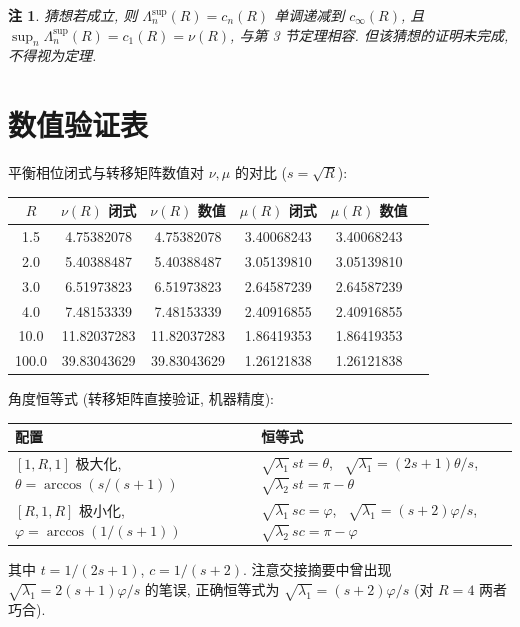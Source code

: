 \documentclass[UTF8]{ctexart}
\newtheorem{remark}[theorem]{注}
\begin{document}
\begin{remark}
猜想若成立, 则 $\Lambda_n^{\sup}(R) = c_n(R)$ 单调递减到 $c_{\infty}(R)$,
且 $\sup_n \Lambda_n^{\sup}(R) = c_1(R) = \nu(R)$, 与第 3 节定理相容.
但该猜想的证明未完成, 不得视为定理.
\end{remark}

\section{数值验证表}

平衡相位闭式与转移矩阵数值对 $\nu, \mu$ 的对比 ($s = \sqrt{R}$):

\begin{center}
\begin{tabular}{cccccc}
	\toprule
	$R$ & $\nu(R)$ 闭式 & $\nu(R)$ 数值 & $\mu(R)$ 闭式 & $\mu(R)$ 数值 \\
	\midrule
	1.5 & 4.75382078 & 4.75382078 & 3.40068243 & 3.40068243 \\
	2.0 & 5.40388487 & 5.40388487 & 3.05139810 & 3.05139810 \\
	3.0 & 6.51973823 & 6.51973823 & 2.64587239 & 2.64587239 \\
	4.0 & 7.48153339 & 7.48153339 & 2.40916855 & 2.40916855 \\
	10.0 & 11.82037283 & 11.82037283 & 1.86419353 & 1.86419353 \\
	100.0 & 39.83043629 & 39.83043629 & 1.26121838 & 1.26121838 \\
	\bottomrule
\end{tabular}
\end{center}

角度恒等式 (转移矩阵直接验证, 机器精度):

\begin{center}
\begin{tabular}{ll}
	\toprule
	配置 & 恒等式 \\
	\midrule
	$[1,R,1]$ 极大化, $\theta = \arccos(s/(s+1))$ & $\sqrt{\lambda_1}\,s t = \theta$, \ $\sqrt{\lambda_1} = (2s+1)\theta/s$, \ $\sqrt{\lambda_2}\,s t = \pi-\theta$ \\
	$[R,1,R]$ 极小化, $\varphi = \arccos(1/(s+1))$ & $\sqrt{\lambda_1}\,s c = \varphi$, \ $\sqrt{\lambda_1} = (s+2)\varphi/s$, \ $\sqrt{\lambda_2}\,s c = \pi-\varphi$ \\
	\bottomrule
\end{tabular}
\end{center}

其中 $t = 1/(2s+1)$, $c = 1/(s+2)$. 注意交接摘要中曾出现
$\sqrt{\lambda_1} = 2(s+1)\varphi/s$ 的笔误, 正确恒等式为 $\sqrt{\lambda_1} = (s+2)\varphi/s$ (对 $R=4$ 两者巧合).
\end{document}
